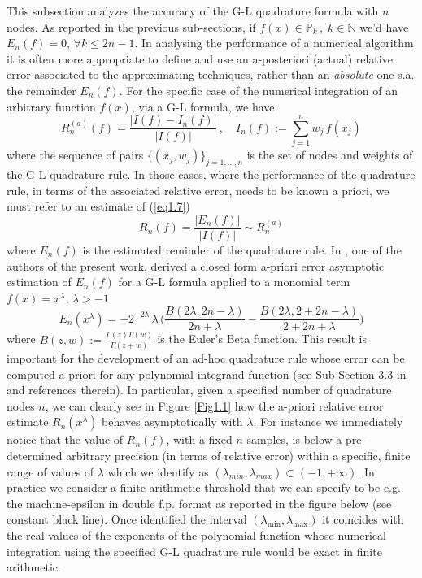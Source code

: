 \documentclass[a4paper, twosided]{book}
\begin{document}
This subsection analyzes the accuracy of the G-L quadrature formula with $n$ nodes. As reported in the previous sub-sections, if $f(x)\in\mathbb{P}_k\,,\;k\in\mathbb{N}$ we'd have $E_n(f)=0,\,\forall k\leq2n-1$.  
In analysing the performance of a numerical algorithm it is often more appropriate to define and use an a-posteriori (actual) relative error associated to the approximating techniques, rather than an {\itshape absolute} one s.a. the remainder $E_n(f)$. For the specific case of the numerical integration of an arbitrary function $f(x)$, via a G-L formula, we have
\begin{equation}\label{eq1.7}
    R_n^{(a)}(f) = \frac{|I(f)-I_n(f)|}{|I(f)|}\,,\quad I_n(f):=\sum_{j=1}^{n}w_j\,f(x_j)
\end{equation}
\noindent
where the sequence of pairs $\{(x_j,w_j)\}_{j=1,...,n}$ is the set of nodes and weights of the G-L quadrature rule. In those cases, where the performance of the quadrature rule, in terms of the associated relative error, needs to be known a priori, we must refer to an estimate of (\ref{eq1.7}) 
\begin{equation}\label{eq1.8}
    R_n(f) = \frac{|E_n(f)|}{|I(f)|} \sim R_n^{(a)}
\end{equation}
where $E_n(f)$ is the estimated reminder of the quadrature rule. In \cite{Lombardi09}, one of the authors of the present work, derived a closed form a-priori error asymptotic estimation of $E_n(f)$ for a G-L formula applied to a monomial term $f(x)=x^\lambda,\, \lambda>-1$
\begin{equation}\label{eq1.9}
    E_n(x^\lambda) = -2^{-2\lambda}\,\lambda\,\bigg(\frac{B(2\lambda,2n-\lambda)}{2n+\lambda} - \frac{B(2\lambda, 2+2n-\lambda)}{2+2n+\lambda}\bigg)
\end{equation}
\noindent
where $B(z,w):=\frac{\Gamma(z)\Gamma(w)}{\Gamma(z+w)}$ is the Euler's Beta function. This result is important for the development of an ad-hoc quadrature rule whose error can be computed a-priori for any polynomial integrand function (see Sub-Section 3.3 in \cite{Lombardi21} and references therein). In particular, given a specified number of quadrature nodes $n$, we can clearly see in Figure \ref{Fig1.1} how the a-priori relative error estimate $R_n(x^\lambda)$ behaves asymptotically with $\lambda$. For instance we immediately notice that the value of $R_n(f)$, with a fixed $n$ samples, is below a pre-determined arbitrary precision (in terms of relative error) within a specific, finite range of values of $\lambda$ which we identify as $(\lambda_{min},\lambda_{max})\subset(-1,+\infty)$. In practice we consider a finite-arithmetic threshold that we can specify to be e.g. the machine-epsilon in double f.p. format as reported in the figure below (see constant black line). Once identified the interval $(\lambda_{\text{min}}, \lambda_{\text{max}})$ it coincides with the real values of the exponents of the polynomial function whose numerical integration using the specified G-L quadrature rule would be exact in finite arithmetic.
\end{document}
